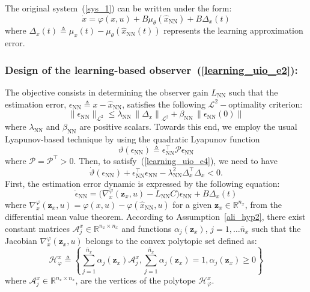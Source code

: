\documentclass{ifacconf}
\def\eqref#1{(\ref{#1})}
\def\nn{\mathrm{NN}}
\def\Lo{L}
\begin{document}
The original system~\eqref{sys_1} can be written under the form:
\begin{equation}\label{learning_uio_e3}
        \dot{x} = \varphi(x,u) + B \mu_{\theta}(\hat{x}_{\nn}) + B \Delta_{x}(t)
\end{equation}
where $\Delta_{x}(t) \triangleq \mu_{x}(t) -  \mu_{\theta}(\hat{x}_{\nn}(t))$ represents the learning approximation error.





\vspace*{-0.3cm}
\subsubsection{Design of the learning-based observer~\eqref{learning_uio_e2}:}
The objective consists in determining the observer gain $\Lo_{\nn}$ such that the estimation error, $\epsilon_{\nn} \triangleq x - \hat{x}_{\nn}$, satisfies the following $\mathcal{L}^{2}-$optimality criterion:
\begin{equation}\label{learning_uio_e4}
\| \epsilon_{\nn} \|_{\mathcal{L}^{2}} \leq \lambda_{\nn} \, \left\| \Delta_x \right\|_{\mathcal{L}^{2}}  + \beta_{\nn} \, \left\| \epsilon_{\nn}(0) \right\| 
\end{equation}
where $\lambda_{\nn}$ and $\beta_{\nn}$ are positive scalars. Towards this end, we employ the usual Lyapunov-based technique by using the quadratic Lyapunov function
$$
\vartheta\left( \epsilon_{\nn} \right) \triangleq \epsilon^{\top}_{\nn} \mathcal{P} \epsilon_{\nn}
$$
where $\mathcal{P} = \mathcal{P}^{\top} > 0$. Then, to satisfy~\eqref{learning_uio_e4}, we need to have
$$
\dot{\vartheta}\left( \epsilon_{\nn} \right) + \epsilon^{\top}_{\nn} \epsilon_{\nn} - \lambda^{2}_{\nn} \Delta^{\top}_x \Delta_x < 0.
$$
First, the estimation error dynamic is expressed by the following equation:
\begin{equation}\label{learning_uio_e5}
        \dot{\epsilon}_{\nn} = \Big( \nabla^{\varphi}_{x}(\bm{z}_{x},u) - \Lo_{\nn} C \Big) \epsilon_{\nn} + B \Delta_{x}(t)
\end{equation}
where $\nabla^{\varphi}_{x}(\bm{z}_{x},u) = \varphi(x,u) - \varphi(\hat{x}_{\nn},u)$ for a given $\bm{z}_{x} \in \mathbb{R}^{n_x}$, from the differential mean value theorem.
According to Assumption~\ref{ali_hyp2}, there exist constant matrices $\mathcal{A}^{x}_{j} \in \mathbb{R}^{n_x \times n_x}$ and functions $\alpha_{j}(\bm{z}_x)$, $j=1,\dots \bar{n}_{x}$ such that the Jacobian $\nabla^{\varphi}_{x}(\bm{z}_{x},u)$ belongs to the convex polytopic set defined as:
\begin{equation}\label{varphi_x}
\mathcal{H}^{x}_{\varphi} \triangleq \left\{ \sum^{\bar{n}_{x}}_{j=1}\alpha_{j} (\bm{z}_{x}) \mathcal{A}^{x}_{j}, \sum^{\bar{n}_{x}}_{j=1}\alpha_{j}(\bm{z}_{x}) =1, \alpha_{j}(\bm{z}_{x}) \geq0 \right\}
\end{equation}
where $\mathcal{A}^{x}_{j} \in \mathbb{R}^{n_x \times n_x}$, are the vertices of the polytope $\mathcal{H}^{x}_{\varphi}$. 
\end{document}
